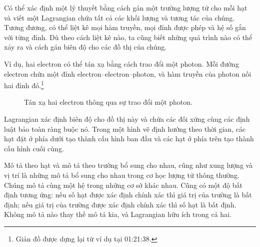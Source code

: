 Có thể xác định một lý thuyết bằng cách gán một trường lượng tử cho mỗi hạt và viết một Lagrangian chứa tất cả các khối lượng và tương tác của chúng. Tương đương, có thể liệt kê mọi hàm truyền, mọi đỉnh được phép và hệ số gắn với từng đỉnh. Dù theo cách liệt kê nào, ta cũng biết những quá trình nào có thể xảy ra và cách gán biên độ cho các đồ thị của chúng.

Ví dụ, hai electron có thể tán xạ bằng cách trao đổi một photon. Mỗi đường electron chứa một đỉnh electron--electron--photon, và hàm truyền của photon nối hai đỉnh đó.\footnote{Giản đồ được dựng lại từ ví dụ tại 01:21:38.}

\begin{figure}[htbp]
\centering
{}
\caption{Tán xạ hai electron thông qua sự trao đổi một photon.}
\end{figure}

Lagrangian xác định biên độ cho đồ thị này và chứa các đối xứng cùng các định luật bảo toàn ràng buộc nó. Trong một hình vẽ định hướng theo thời gian, các hạt đặt ở phía dưới tạo thành cấu hình ban đầu và các hạt ở phía trên tạo thành cấu hình cuối cùng.

\begin{classroomqa}
\end{classroomqa}

Mô tả theo hạt và mô tả theo trường bổ sung cho nhau, cũng như xung lượng và vị trí là những mô tả bổ sung cho nhau trong cơ học lượng tử thông thường. Chúng mô tả cùng một hệ trong những cơ sở khác nhau. Cũng có một độ bất định tương ứng: nếu số hạt được xác định chính xác thì giá trị của trường là bất định; nếu giá trị của trường được xác định chính xác thì số hạt là bất định. Không mô tả nào thay thế mô tả kia, và Lagrangian hữu ích trong cả hai.

\begin{classroomqa}
\end{classroomqa}

